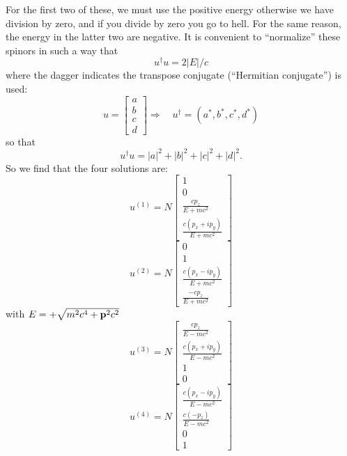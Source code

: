 For the first two of these, we must use the positive energy otherwise we have
division by zero, and if you divide by zero you go to hell. For the same reason,
the energy in the latter two are negative. It is convenient to ``normalize'' these
spinors in such a way that
\begin{equation}
u^\dag u = 2|E|/c
\end{equation}
where the dagger indicates the transpose conjugate (``Hermitian conjugate'') is
used:
\begin{equation*}
u = \begin{bmatrix}a\\b\\c\\d\end{bmatrix}\Rightarrow\quad u^\dag = (a^*, b^*, c^*, d^*)
\end{equation*}
so that
\begin{equation}
u^\dag u = |a|^2 + |b|^2 + |c|^2 + |d|^2.
\end{equation}
So we find that the four solutions are:
\begin{equation}
u^{(1)} = N\begin{bmatrix}1\\0\\\frac{\displaystyle cp_{z}}{\displaystyle E+mc^2}\\ \frac{\displaystyle c(p_{x}+ip_{y})}{\displaystyle E+mc^2}\end{bmatrix}
\end{equation}
\begin{equation}
u^{(2)} = N\begin{bmatrix}0\\1\\ \frac{\displaystyle c(p_{x}-ip_{y})}{\displaystyle E+mc^2}\\\frac{\displaystyle -cp_{z}}{\displaystyle E+mc^2}\end{bmatrix}
\end{equation}
with $E = +\sqrt{m^2c^4 + \bold{p}^2c^2}$
\begin{equation}
u^{(3)} = N\begin{bmatrix}\frac{\displaystyle cp_{z}}{\displaystyle E-mc^2}\\ \frac{\displaystyle c(p_{x}+ip_{y})}{\displaystyle E-mc^2}\\1\\0\end{bmatrix}
\end{equation}
\begin{equation}
u^{(4)} = N\begin{bmatrix} \frac{\displaystyle c(p_{x}-ip_{y})}{\displaystyle E-mc^2}\\\frac{\displaystyle c(-p_{z})}{\displaystyle E-mc^2}\\ 0\\1\end{bmatrix}
\end{equation}
